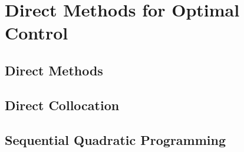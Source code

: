 \newpage

\section{Direct Methods for Optimal Control}

\subsection{Direct Methods}

\subsection{Direct Collocation}

\subsection{Sequential Quadratic Programming}